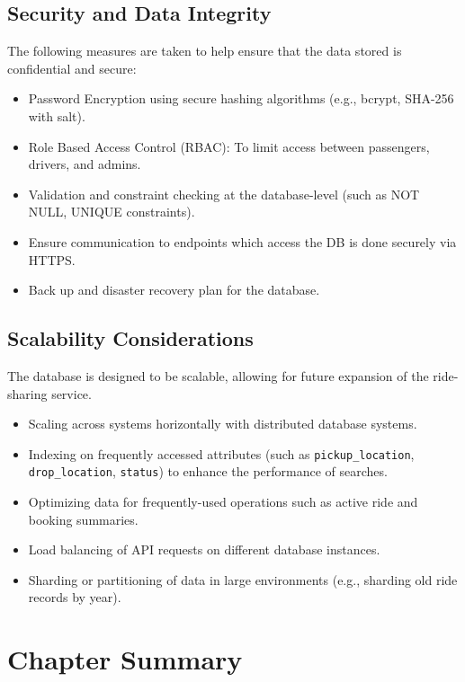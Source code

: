 \subsection{Security and Data Integrity}

The following measures are taken to help ensure that the data stored is confidential and secure:
\begin{itemize}
    \item Password Encryption using secure hashing algorithms (e.g., bcrypt, SHA-256 with salt).
    \item Role Based Access Control (RBAC): To limit access between passengers, drivers, and admins.
    \item Validation and constraint checking at the database-level (such as NOT NULL, UNIQUE constraints).
    \item Ensure communication to endpoints which access the DB is done securely via HTTPS.
    \item Back up and disaster recovery plan for the database.
\end{itemize}

\subsection{Scalability Considerations}

The database is designed to be scalable, allowing for future expansion of the ride-sharing service.
\begin{itemize}
    \item Scaling across systems horizontally with distributed database systems.
    \item Indexing on frequently accessed attributes (such as \texttt{pickup\_location}, \texttt{drop\_location}, \texttt{status}) to enhance the performance of searches.
    \item Optimizing data for frequently-used operations such as active ride and booking summaries.
    \item Load balancing of API requests on different database instances.
    \item Sharding or partitioning of data in large environments (e.g., sharding old ride records by year).
\end{itemize}

\section{Chapter Summary}

